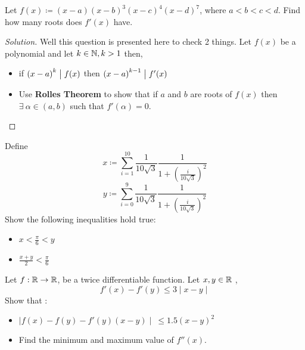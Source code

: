 \documentclass{scrartcl} %
\begin{document}
\begin{example}[CMI A7, 2014]
Let $f(x) \coloneq \left(x - a\right)\left(x-b\right)^3\left(x-c\right)^4\left(x-d\right)^7$, where $a < b < c < d$. Find how many roots does $f'(x)$ have.
\end{example}
\begin{proof}[Solution]
Well this question is presented here to check 2 things. Let $f(x)$ be a polynomial and let $k \in \mathbb N, k > 1$ then,
\begin{itemize}
	\item if $\left(x - a\right)^k \bigm| f(x)$ then $\left(x - a\right)^{k -
		1} \bigm| f'(x)$
	\item Use \textbf{Rolles Theorem} to show that if $a$ and $b$ are roots of $
		f(x)$ then $\exists\ \alpha \in (a,b)$ such that $f'(\alpha) = 0$.

\end{itemize}

\end{proof}
\begin{example}[CMI B4, 2012]
Define 
\[
	x \coloneq \sum_{i = 1}^10 \dfrac{1}{10\sqrt{3}}\dfrac{1}{1 + \left(\frac{i}{10
	\sqrt{3}}\right)^2}
\]
\[
	y \coloneq \sum_{i = 0}^9\dfrac{1}{10\sqrt{3}}\dfrac{1}{1 + \left(\frac{i}{10
	\sqrt{3}}\right)^2}
\]
Show the following inequalities hold true:
\begin{itemize}
	\item $x < \frac{\pi}{6} < y$
	\item $\frac{x + y }{2} < \frac{\pi}{6}$
\end{itemize}
\end{example}
\newpage
\begin{example}


Let $f : \mathbb R \rightarrow \mathbb R$, be a twice differentiable function. Let $x,y \in \mathbb R$
,
\[
	f'(x) - f'(y) \leq 3\mid x - y\mid
\]
Show that :
\begin{itemize}
	\item $\mid f(x) - f(y) - f'(y)(x - y)\mid \ \leq 1.5\left(x-y\right)^2$ 
	\item Find the minimum and maximum value of $f''(x)$.
\end{itemize}

\end{example}
\end{document}

